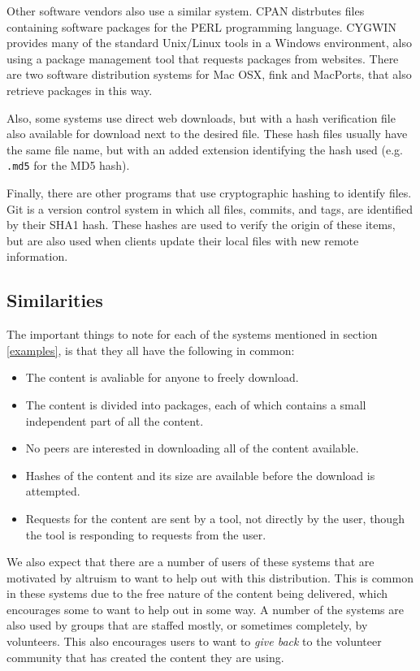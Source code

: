 \documentclass[conference]{IEEEtran}
\begin{document}
Other software vendors also use a similar system. CPAN \cite{cpan}
distrbutes files containing software packages for the PERL
programming language. CYGWIN \cite{cygwin} provides many of the
standard Unix/Linux tools in a Windows environment, also using a
package management tool that requests packages from websites. There
are two software distribution systems for Mac OSX, fink and
MacPorts, that also retrieve packages in this way.

Also, some systems use direct web downloads, but with a hash
verification file also available for download next to the desired
file. These hash files usually have the same file name, but with an
added extension identifying the hash used (e.g. \texttt{.md5} for
the MD5 hash).

Finally, there are other programs that use cryptographic hashing to
identify files. Git is a version control system in which all files,
commits, and tags, are identified by their SHA1 hash. These hashes
are used to verify the origin of these items, but are also used when
clients update their local files with new remote information.

\subsection{Similarities}
\label{similarities}

The important things to note for each of the systems mentioned in
section \ref{examples}, is that they all have the following in
common:
\begin{itemize}
 \item The content is avaliable for anyone to freely download.
 \item The content is divided into packages, each of which contains
       a small independent part of all the content.
 \item No peers are interested in downloading all of the content
       available.
 \item Hashes of the content and its size are available before the
       download is attempted.
 \item Requests for the content are sent by a tool, not directly by
       the user, though the tool is responding to requests from the user.
\end{itemize}

We also expect that there are a number of users of these systems
that are motivated by altruism to want to help out with this
distribution. This is common in these systems due to the free nature
of the content being delivered, which encourages some to want to
help out in some way. A number of the systems are also used by
groups that are staffed mostly, or sometimes completely, by
volunteers. This also encourages users to want to \emph{give back}
to the volunteer community that has created the content they are
using.
\end{document}
